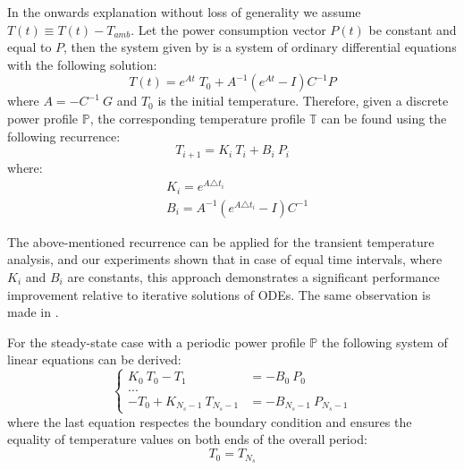 In the onwards explanation without loss of generality we assume $T(t) \equiv T(t) - T_{amb}$. Let the power consumption vector $P(t)$ be constant and equal to $P$, then the system given by  is a system of ordinary differential equations with the following solution:
\begin{equation} \label{eq:solution}
  T(t) = e^{A t} \; T_0 + A^{-1}(e^{A t} - I)C^{-1} P
\end{equation}
where $A = -C^{-1} \: G$ and $T_0$ is the initial temperature. Therefore, given a discrete power profile $\mathbb{P}$, the corresponding temperature profile $\mathbb{T}$ can be found using the following recurrence:
\begin{equation} \label{eq:recurrent-system}
  T_{i+1} = K_i \: T_i + B_i \: P_i
\end{equation}
where:
\begin{align*}
  & K_i = e^{A \triangle t_i} \\
  & B_i = A^{-1}(e^{A \triangle t_i} - I)C^{-1}
\end{align*}

The above-mentioned recurrence can be applied for the transient temperature analysis, and our experiments shown that in case of equal time intervals, where $K_i$ and $B_i$ are constants, this approach demonstrates a significant performance improvement relative to iterative solutions of ODEs. The same observation is made in \cite{thiele2011}.

For the steady-state case with a periodic power profile $\mathbb{P}$ the following system of linear equations can be derived:
\[
  \begin{cases}
    K_0 \: T_0 - T_1 & = -B_0 \: P_0 \\
    ... \\
    -T_0 + K_{N_s - 1} \: T_{N_s - 1} & = -B_{N_s - 1} \: P_{N_s - 1}
  \end{cases}
\]
where the last equation respectes the boundary condition and ensures the equality of temperature values on both ends of the overall period:
\begin{equation} \label{eq:boundary-condition}
  T_0 = T_{N_s}
\end{equation}

